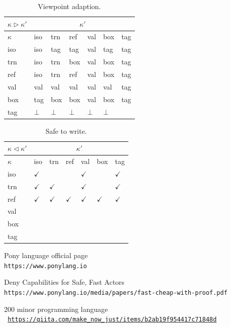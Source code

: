 \documentclass{article}
\begin{document}
\begin{multicols}{2}
\begin{table}[]
\centering
\begin{tabular}{lllllll}
\hline
$\kappa \triangleright \kappa'$ & \multicolumn{6}{c}{$\kappa'$}             \\ \hline
$\kappa$                 & iso & trn & ref & val & box & tag \\ \hline \hline
iso               & iso & tag & tag & val & tag & tag \\ \hline
trn               & iso & trn & box & val & box & tag \\ \hline
ref               & iso & trn & ref & val & box & tag \\ \hline
val               & val & val & val & val & val & tag \\ \hline
box               & tag & box & box & val & box & tag \\ \hline
tag               &  $\bot$ & $\bot$ & $\bot$ & $\bot$ & $\bot$ &     \\ \hline
\end{tabular}
\caption{Viewpoint adaption.\cite{type-proof-paper}}
\end{table}


\begin{table}[]
\centering
\begin{tabular}{lllllll}
\hline
$\kappa \triangleleft \kappa'$ & \multicolumn{6}{c}{$\kappa'$}             \\ \hline
$\kappa$                 & iso & trn & ref & val & box & tag \\ \hline \hline
iso               & $\checkmark$ &  &  & $\checkmark$ &  & $\checkmark$ \\ \hline
trn               & $\checkmark$ & $\checkmark$ &  & $\checkmark$ &  & $\checkmark$ \\ \hline
ref               & $\checkmark$ & $\checkmark$ & $\checkmark$ & $\checkmark$ & $\checkmark$ & $\checkmark$ \\ \hline
val               &  &  &  &  &  &  \\ \hline
box               &  &  &  &  &  &  \\ \hline
tag               &   &  &  &  &  &     \\ \hline
\end{tabular}
\caption{Safe to write.\cite{type-proof-paper}}
\end{table}




\begin{thebibliography}{9}
Pony language official page
\\\texttt{https://www.ponylang.io}

Deny Capabilities for Safe, Fast Actors
\\\texttt{https://www.ponylang.io/media/papers/fast-cheap-with-proof.pdf}	

200 minor programming language
\\\texttt{ \url{https://qiita.com/make_now_just/items/b2ab19f954417c71848d} }

\end{thebibliography}
\end{multicols}
\end{document}
